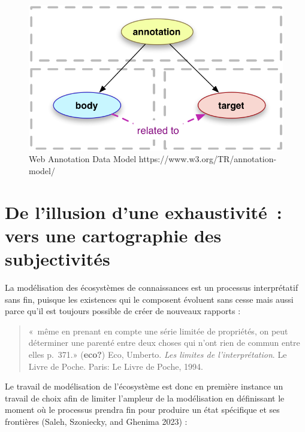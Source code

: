\documentclass[
  letterpaper,
  DIV=11,
  numbers=noendperiod]{scrreprt}
\begin{document}
\begin{figure}

{\centering \includegraphics{media/10000001000002C2000001965EFA665F8AB6D163.png}

}

\caption{\label{fig-webAnnotation}Web Annotation Data Model
https://www.w3.org/TR/annotation-model/}

\end{figure}

\hypertarget{sec-illusionExhaustivite}{%
\section{De l'illusion d'une exhaustivité~: vers une cartographie des
subjectivités}\label{sec-illusionExhaustivite}}

La modélisation des écosystèmes de connaissances est un processus
interprétatif sans fin, puisque les existences qui le composent évoluent
sans cesse mais aussi parce qu'il est toujours possible de créer de
nouveaux rapports :

\begin{quote}
«~même en prenant en compte une série limitée de propriétés, on peut
déterminer une parenté entre deux choses qui n'ont rien de commun entre
elles p.~371.» (\textbf{eco?}) Eco, Umberto. \emph{Les limites de
l'interprétation}. Le Livre de Poche. Paris: Le Livre de Poche, 1994.
\end{quote}

Le travail de modélisation de l'écosystème est donc en première instance
un travail de choix afin de limiter l'ampleur de la modélisation en
définissant le moment où le processus prendra fin pour produire un état
spécifique et ses frontières (Saleh, Szoniecky, and Ghenima 2023) :
\end{document}
